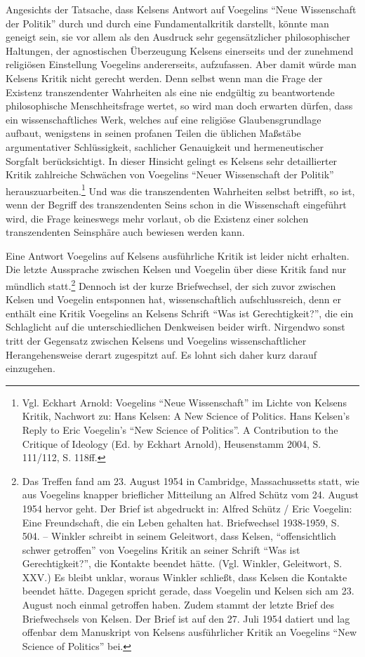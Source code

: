 \documentclass[12pt,a4paper,ngerman]{article}
\begin{document}
Angesichts der Tatsache, dass Kelsens Antwort auf Voegelins "`Neue
Wissenschaft der Politik"' durch und durch eine Fundamentalkritik darstellt,
könnte man geneigt sein, sie vor allem als den Ausdruck sehr gegensätzlicher
philosophischer Haltungen, der agnostischen Überzeugung Kelsens einerseits und
der zunehmend religiösen Einstellung Voegelins andererseits, aufzufassen. Aber
damit würde man Kelsens Kritik nicht gerecht werden. Denn selbst wenn man die
Frage der Existenz transzendenter Wahrheiten als eine nie endgültig zu
beantwortende philosophische Menschheitsfrage wertet, so wird man doch
erwarten dürfen, dass ein wissenschaftliches Werk, welches auf eine religiöse
Glaubensgrundlage aufbaut, wenigstens in seinen profanen Teilen die üblichen
Maßstäbe argumentativer Schlüssigkeit, sachlicher Genauigkeit und
hermeneutischer Sorgfalt berücksichtigt. In dieser Hinsicht gelingt es Kelsens
sehr detaillierter Kritik zahlreiche Schwächen von Voegelins "`Neuer
Wissenschaft der Politik"' herauszuarbeiten.\footnote{Vgl. Eckhart Arnold:
  Voegelins "`Neue Wissenschaft"' im Lichte von Kelsens Kritik, Nachwort zu:
  Hans Kelsen: A New Science of Politics. Hans Kelsen's Reply to Eric
  Voegelin's "`New Science of Politics"'. A Contribution to the Critique of
  Ideology (Ed. by Eckhart Arnold), Heusenstamm 2004, S. 111/112, S. 118ff.}
Und was die transzendenten Wahrheiten selbst betrifft, so ist, wenn der
Begriff des transzendenten Seins schon in die Wissenschaft eingeführt wird,
die Frage keineswegs mehr vorlaut, ob die Existenz einer solchen
transzendenten Seinsphäre auch bewiesen werden kann.

Eine Antwort Voegelins auf Kelsens ausführliche Kritik ist leider nicht
erhalten. Die letzte Aussprache zwischen Kelsen und Voegelin über diese Kritik
fand nur mündlich statt.\footnote{Das Treffen fand am 23. August 1954 in
  Cambridge, Massachussetts statt, wie aus Voegelins knapper brieflicher
  Mitteilung an Alfred Schütz vom 24. August 1954 hervor geht. Der Brief ist
  abgedruckt in: Alfred Schütz / Eric Voegelin: Eine Freundschaft, die ein
  Leben gehalten hat.  Briefwechsel 1938-1959, S. 504. -- Winkler schreibt in
  seinem Geleitwort, dass Kelsen, "`offensichtlich schwer getroffen"' von
  Voegelins Kritik an seiner Schrift "`Was ist Gerechtigkeit?"', die Kontakte
  beendet hätte. (Vgl. Winkler, Geleitwort, S.  XXV.) Es bleibt unklar, woraus
  Winkler schließt, dass Kelsen die Kontakte beendet hätte. Dagegen spricht
  gerade, dass Voegelin und Kelsen sich am 23. August noch einmal getroffen
  haben.  Zudem stammt der letzte Brief des Briefwechsels von Kelsen. Der
  Brief ist auf den 27. Juli 1954 datiert und lag offenbar dem Manuskript von
  Kelsens ausführlicher Kritik an Voegelins "`New Science of Politics"' bei.}
Dennoch ist der kurze Briefwechsel, der sich zuvor zwischen Kelsen und
Voegelin entsponnen hat, wissenschaftlich aufschlussreich, denn er enthält
eine Kritik Voegelins an Kelsens Schrift "`Was ist Gerechtigkeit?"', die ein
Schlaglicht auf die unterschiedlichen Denkweisen beider wirft.  Nirgendwo
sonst tritt der Gegensatz zwischen Kelsens und Voegelins wissenschaftlicher
Herangehensweise derart zugespitzt auf. Es lohnt sich daher kurz darauf
einzugehen.
\end{document}
